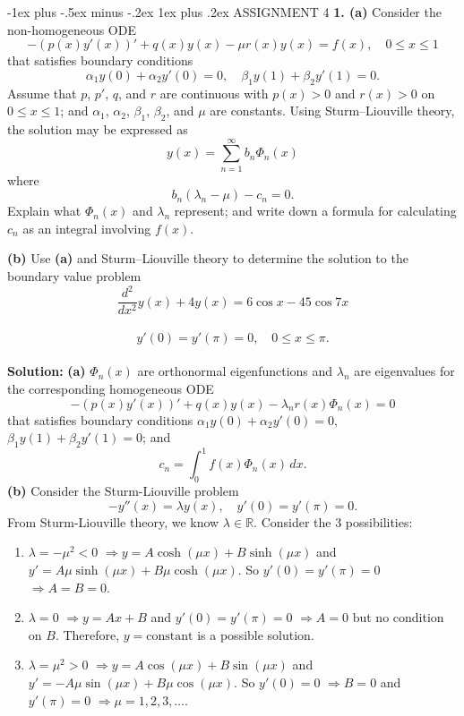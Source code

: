 \documentclass[10pt,landscape]{article}
\makeatletter
\renewcommand{\subsubsection}{\@startsection{subsubsection}{3}{0mm}%
                                {-1ex plus -.5ex minus -.2ex}%
                                {1ex plus .2ex}%
                                {\normalfont\small\bfseries}}
\makeatother
\begin{document}
\begin{multicols}{2}
\subsubsection{ASSIGNMENT 4}
\textbf{1. (a)} Consider the non-homogeneous ODE\\
\[
- \left( p(x)y'(x) \right)' + q(x)y(x) - \mu r(x) y(x) = f(x), \quad 0 \le x \le 1
\]
that satisfies boundary conditions\\
\[
\alpha_1 y(0) + \alpha_2 y'(0) = 0, \quad \beta_1 y(1) + \beta_2 y'(1) = 0.
\]
Assume that \( p \), \( p' \), \( q \), and \( r \) are continuous with \( p(x) > 0 \) and \( r(x) > 0 \) on \( 0 \le x \le 1 \); and \( \alpha_1 \), \( \alpha_2 \), \( \beta_1 \), \( \beta_2 \), and \( \mu \) are constants. Using Sturm–Liouville theory, the solution may be expressed as\\
\[
y(x) = \sum_{n=1}^{\infty} b_n \Phi_n(x)
\]
where\\
\[
b_n (\lambda_n - \mu) - c_n = 0.
\]
Explain what \( \Phi_n(x) \) and \( \lambda_n \) represent; and write down a formula for calculating \( c_n \) as an integral involving \( f(x) \).

\textbf{(b)} Use \textbf{(a)} and Sturm–Liouville theory to determine the solution to the boundary value problem\\
\[
\frac{d^2}{dx^2} y(x) + 4y(x) = 6 \cos x - 45 \cos 7x\]\\\[ y'(0) = y'( \pi) = 0, \quad 0 \le x \le \pi.
\]\\
\bigskip
\textbf{Solution:}
\textbf{(a)} \( \Phi_n(x) \) are orthonormal eigenfunctions and \( \lambda_n \) are eigenvalues for the corresponding homogeneous ODE\\
\[
- \left( p(x)y'(x) \right)' + q(x)y(x) - \lambda_n r(x) \Phi_n(x) = 0
\]
that satisfies boundary conditions \( \alpha_1 y(0) + \alpha_2 y'(0) = 0 \), \( \beta_1 y(1) + \beta_2 y'(1) = 0 \); and\\
\[
c_n = \int_0^1 f(x) \Phi_n(x) \, dx.
\]
\textbf{(b)} Consider the Sturm-Liouville problem\\
\[
-y''(x) = \lambda y(x), \quad y'(0) = y'(\pi) = 0.
\]
From Sturm-Liouville theory, we know \( \lambda \in \mathbb{R} \). Consider the 3 possibilities:
\begin{enumerate}
\item \( \lambda = -\mu^2 < 0 \) \(\Rightarrow y = A \cosh(\mu x) + B \sinh(\mu x) \) and \( y' = A\mu \sinh(\mu x) + B\mu \cosh(\mu x) \). So \( y'(0) = y'(\pi) = 0 \) \(\Rightarrow A = B = 0\).
\item \( \lambda = 0 \) \(\Rightarrow y = A x + B \) and \( y'(0) = y'(\pi) = 0 \) \(\Rightarrow A = 0 \) but no condition on \( B \). Therefore, \( y = \text{constant} \) is a possible solution.
\item  \( \lambda = \mu^2 > 0 \) \(\Rightarrow y = A \cos(\mu x) + B \sin(\mu x) \) and \( y' = -A \mu \sin(\mu x) + B \mu \cos(\mu x) \). So \( y'(0) = 0 \) \(\Rightarrow B = 0 \) and \( y'(\pi) = 0 \) \(\Rightarrow \mu = 1, 2, 3, \dots \).
\end{enumerate}


\end{multicols}
\end{document}
